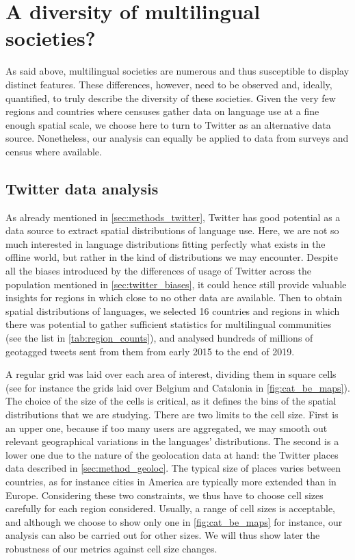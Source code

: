 \documentclass[../thesis.tex]{subfiles}
\begin{document}
\section{A diversity of multilingual societies?}
\label{sec:multiling_data}
As said above, multilingual societies are numerous and thus susceptible to display
distinct features. These differences, however, need to be observed and, ideally,
quantified, to truly describe the diversity of these societies. Given the very few
regions and countries where censuses gather data on language use at a fine enough
spatial scale, we choose here to turn to Twitter as an alternative data source.
Nonetheless, our analysis can equally be applied to data from surveys and census where
available.


\subsection{Twitter data analysis}
As already mentioned in \cref{sec:methods_twitter}, Twitter has good potential as a data
source to extract spatial distributions of language use. Here, we are not so much
interested in language distributions fitting perfectly what exists in the offline world,
but rather in the kind of distributions we may encounter. Despite all the biases
introduced by the differences of usage of Twitter across the population mentioned in
\cref{sec:twitter_biases}, it could hence still provide valuable insights for regions in
which close to no other data are available. Then to obtain spatial distributions of
languages, we selected 16 countries and regions in which there was potential to gather
sufficient statistics for multilingual communities (see the list in
\cref{tab:region_counts}), and analysed hundreds of millions of geotagged tweets sent
from them from early 2015 to the end of 2019.

A regular grid was laid over each area of interest, dividing them in square cells (see
for instance the grids laid over Belgium and Catalonia in \cref{fig:cat_be_maps}). The
choice of the size of the cells is critical, as it defines the bins of the spatial
distributions that we are studying. There are two limits to the cell size. First is an
upper one, because if too many users are aggregated, we may smooth out relevant
geographical variations in the languages' distributions. The second is a lower one due
to the nature of the geolocation data at hand: the Twitter places data described in
\cref{sec:method_geoloc}. The typical size of places varies between countries, as for
instance cities in America are typically more extended than in Europe. Considering these
two constraints, we thus have to choose cell sizes carefully for each region considered.
Usually, a range of cell sizes is acceptable, and although we choose to show only one in
\cref{fig:cat_be_maps} for instance, our analysis can also be carried out for other
sizes. We will thus show later the robustness of our metrics against cell size changes. 
\end{document}
